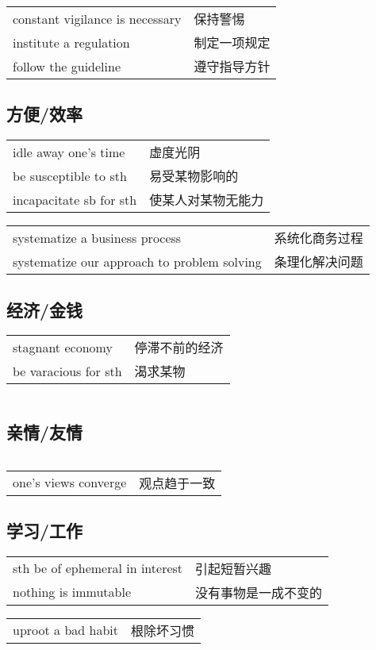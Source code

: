 \begin{tabular}{ll}
    constant vigilance is necessary & 保持警惕   \\
    institute a regulation          & 制定一项规定 \\
    follow the guideline            & 遵守指导方针 \\
\end{tabular}

\subsection{方便/效率}

\begin{tabular}{ll}
    idle away one's time    & 虚度光阴      \\
    be susceptible to sth   & 易受某物影响的   \\
    incapacitate sb for sth & 使某人对某物无能力 \\
\end{tabular}

\begin{tabular}{ll}
    systematize a business process              & 系统化商务过程 \\
    systematize our approach to problem solving & 条理化解决问题 \\
\end{tabular}

\subsection{经济/金钱}

\begin{tabular}{ll}
    stagnant economy     & 停滞不前的经济 \\
    be varacious for sth & 渴求某物    \\
\end{tabular}

\begin{tabular}{ll}
\end{tabular}

\subsection{亲情/友情}

\begin{tabular}{ll}
\end{tabular}

\begin{tabular}{ll}
    one's views converge & 观点趋于一致 \\
\end{tabular}

\subsection{学习/工作}

\begin{tabular}{ll}
    sth be of ephemeral in interest & 引起短暂兴趣     \\
    nothing is immutable            & 没有事物是一成不变的 \\
\end{tabular}

\begin{tabular}{ll}
    uproot a bad habit & 根除坏习惯 \\
\end{tabular}
